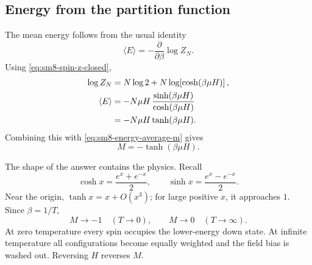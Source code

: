 \begin{classroomqa}
\end{classroomqa}

\subsection{Energy from the partition function}

The mean energy follows from the usual identity
\begin{equation}
 \langle E\rangle
 =-\frac{\partial}{\partial\beta}\log Z_N.
 \label{eq:sm8-energy-identity}
\end{equation}
Using \eqref{eq:sm8-spin-z-closed},
\begin{align}
 \log Z_N
 &=N\log 2+N\log\!\left[\cosh(\beta\mu H)\right],
 \notag\\
 \langle E\rangle
 &=-N\mu H\,
   \frac{\sinh(\beta\mu H)}{\cosh(\beta\mu H)}
 \notag\\
 &=-N\mu H\tanh(\beta\mu H).
 \label{eq:sm8-average-energy}
\end{align}
Combining this with \eqref{eq:sm8-energy-average-m} gives
\begin{equation}
 \boxed{M=-\tanh(\beta\mu H)}.
 \label{eq:sm8-magnetization-tanh}
\end{equation}

The shape of the answer contains the physics.  Recall
\begin{equation}
 \cosh x=\frac{e^x+e^{-x}}{2},
 \qquad
 \sinh x=\frac{e^x-e^{-x}}{2}.
 \label{eq:sm8-hyperbolic-definitions}
\end{equation}
Near the origin, \(\tanh x=x+O(x^3)\); for large positive \(x\), it approaches
\(1\).  Since \(\beta=1/T\),
\begin{equation}
 M\longrightarrow -1
 \quad (T\longrightarrow0),
 \qquad
 M\longrightarrow 0
 \quad (T\longrightarrow\infty).
 \label{eq:sm8-magnetization-limits}
\end{equation}
At zero temperature every spin occupies the lower-energy down state.  At
infinite temperature all configurations become equally weighted and the
field bias is washed out.  Reversing \(H\) reverses \(M\).

